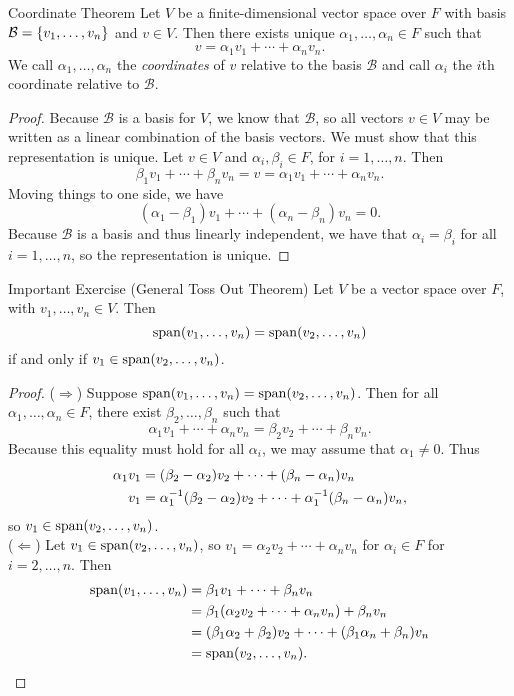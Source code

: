 \documentclass[class=article, crop=false]{standalone}
\begin{document}
  \newpage
  \begin{theorem}{Coordinate Theorem}
    Let $V$ be a finite-dimensional vector space over $F$ with basis $\mathcal{B} = \left\{v_1,\dotsc,v_n\right\}$ and $v\in V$. Then there exists unique $\alpha_1,\dotsc,\alpha_n\in F$ such that
    \[
      v = \alpha_1v_1 + \dotsb + \alpha_nv_n.
    \]
    We call $\alpha_1,\dotsc,\alpha_n$ the \emph{coordinates} of $v$ relative to the basis $\mathcal{B}$ and call $\alpha_i$ the $i$th coordinate relative to $\mathcal{B}$.
  \end{theorem}
  \begin{proof}
    Because $\mathcal{B}$ is a basis for $V$, we know that $\mathcal{B}$, so all vectors $v\in V$ may be written as a linear combination of the basis vectors. We must show that this representation is unique. Let $v\in V$ and $\alpha_i, \beta_i\in F$, for $i = 1,\dotsc,n$. Then
    \[
      \beta_1v_1 + \dotsb + \beta_nv_n = v = \alpha_1v_1 + \dotsb + \alpha_nv_n.
    \]
    Moving things to one side, we have
    \[
      (\alpha_1-\beta_1)v_1 + \dotsb + (\alpha_n-\beta_n)v_n = 0.
    \]
    Because $\mathcal{B}$ is a basis and thus linearly independent, we have that $\alpha_i = \beta_i$ for all $i = 1,\dotsc,n$, so the representation is unique.
  \end{proof}
  \newpage
  \begin{theorem}{Important Exercise (General Toss Out Theorem)}
    Let $V$ be a vector space over $F$, with $v_1,\dotsc,v_n\in V$. Then
    \[
      \operatorname{span}(v_1,\dotsc,v_n) = \operatorname{span}(v_2,\dotsc,v_n)
    \]
    if and only if $v_1\in \operatorname{span}(v_2,\dotsc,v_n)$.
  \end{theorem}
  \begin{proof}
    ($\Rightarrow$) Suppose $\operatorname{span}(v_1,\dotsc,v_n) = \operatorname{span}(v_2,\dotsc,v_n)$. Then for all $\alpha_1,\dotsc,\alpha_n\in F$, there exist $\beta_2,\dotsc,\beta_n$ such that
    \[
      \alpha_1v_1 + \dotsb + \alpha_nv_n = \beta_2v_2 + \dotsb + \beta_nv_n.
    \]
    Because this equality must hold for all $\alpha_i$, we may assume that $\alpha_1\neq 0$. Thus 
    \begin{align*}
      \alpha_1v_1 &= (\beta_2-\alpha_2)v_2 + \dotsb + (\beta_n-\alpha_n)v_n \\
      v_1 &= \alpha_1^{-1}(\beta_2-\alpha_2)v_2 + \dotsb + \alpha_1^{-1}(\beta_n-\alpha_n)v_n,
    \end{align*}
    so $v_1\in \operatorname{span}(v_2,\dotsc,v_n)$. \\[10pt]
    ($\Leftarrow$) Let $v_1 \in \operatorname{span}(v_2,\dotsc,v_n)$, so $v_1 = \alpha_2v_2 + \dotsb + \alpha_nv_n$ for $\alpha_i\in F$ for $i = 2,\dotsc,n$. Then 
    \begin{align*}
      \operatorname{span}(v_1,\dotsc,v_n) &= \beta_1v_1 + \dotsb + \beta_nv_n \\
                             &= \beta_1(\alpha_2v_2 + \dotsb + \alpha_nv_n) + \beta_nv_n \\
                             &= (\beta_1\alpha_2 + \beta_2)v_2 + \dotsb + (\beta_1\alpha_n + \beta_n)v_n \\
                             &= \operatorname{span}(v_2,\dotsc,v_n).
    \end{align*}
  \end{proof}
\end{document}
